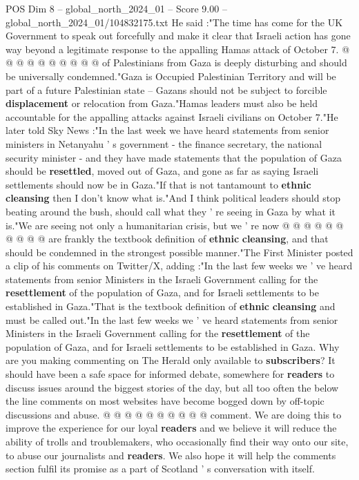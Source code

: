 \begin{textsample}{POS Dim 8 – global\_north\_2024\_01 – Score 9.00 – global\_north\_2024\_01/104832175.txt}
He said :"The time has come for the UK Government to speak out forcefully and make it clear that Israeli action has gone way beyond a legitimate response to the appalling Hamas attack of October 7. @ @ @ @ @ @ @ @ @ @ of Palestinians from Gaza is deeply disturbing and should be universally condemned."Gaza is Occupied Palestinian Territory and will be part of a future Palestinian state -- Gazans should not be subject to forcible \textbf{displacement} or relocation from Gaza."Hamas leaders must also be held accountable for the appalling attacks against Israeli civilians on October 7."He later told Sky News :"In the last week we have heard statements from senior ministers in Netanyahu ' s government - the finance secretary, the national security minister - and they have made statements that the population of Gaza should be \textbf{resettled}, moved out of Gaza, and gone as far as saying Israeli settlements should now be in Gaza."If that is not tantamount to \textbf{ethnic} \textbf{cleansing} then I don't know what is."And I think political leaders should stop beating around the bush, should call what they ' re seeing in Gaza by what it is."We are seeing not only a humanitarian crisis, but we ' re now @ @ @ @ @ @ @ @ @ @ are frankly the textbook definition of \textbf{ethnic} \textbf{cleansing}, and that should be condemned in the strongest possible manner."The First Minister posted a clip of his comments on Twitter/X, adding :"In the last few weeks we ' ve heard statements from senior Ministers in the Israeli Government calling for the \textbf{resettlement} of the population of Gaza, and for Israeli settlements to be established in Gaza."That is the textbook definition of \textbf{ethnic} \textbf{cleansing} and must be called out."In the last few weeks we ' ve heard statements from senior Ministers in the Israeli Government calling for the \textbf{resettlement} of the population of Gaza, and for Israeli settlements to be established in Gaza.
Why are you making commenting on The Herald only available to \textbf{subscribers}?
It should have been a safe space for informed debate, somewhere for \textbf{readers} to discuss issues around the biggest stories of the day, but all too often the below the line comments on most websites have become bogged down by off-topic discussions and abuse. @ @ @ @ @ @ @ @ @ @ comment.
We are doing this to improve the experience for our loyal \textbf{readers} and we believe it will reduce the ability of trolls and troublemakers, who occasionally find their way onto our site, to abuse our journalists and \textbf{readers}.
We also hope it will help the comments section fulfil its promise as a part of Scotland ' s conversation with itself.

\end{textsample}
